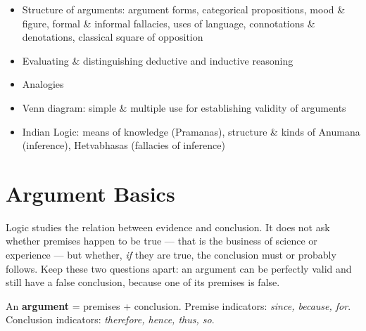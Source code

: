 

\begin{sylbox}

\begin{itemize}
\tightlist
\item[$\square$]
  Structure of arguments: argument forms, categorical propositions, mood \& figure, formal \& informal fallacies, uses of language, connotations \& denotations, classical square of opposition
\item[$\square$]
  Evaluating \& distinguishing deductive and inductive reasoning
\item[$\square$]
  Analogies
\item[$\square$]
  Venn diagram: simple \& multiple use for establishing validity of arguments
\item[$\square$]
  Indian Logic: means of knowledge (Pramanas), structure \& kinds of Anumana (inference), Hetvabhasas (fallacies of inference)
\end{itemize}

\end{sylbox}

\needspace{190pt}

\hypertarget{p1-06--1-argument-basics}{%
\section{Argument Basics}\label{p1-06--1-argument-basics}}

Logic studies the relation between evidence and conclusion. It does not ask whether premises happen to be
true --- that is the business of science or experience --- but whether, \emph{if} they are true, the conclusion
must or probably follows. Keep these two questions apart: an argument can be perfectly valid and still
have a false conclusion, because one of its premises is false.

An \textbf{argument} = premises + conclusion. Premise indicators: \emph{since, because, for}. Conclusion indicators: \emph{therefore, hence, thus, so}.

\begingroup\small


